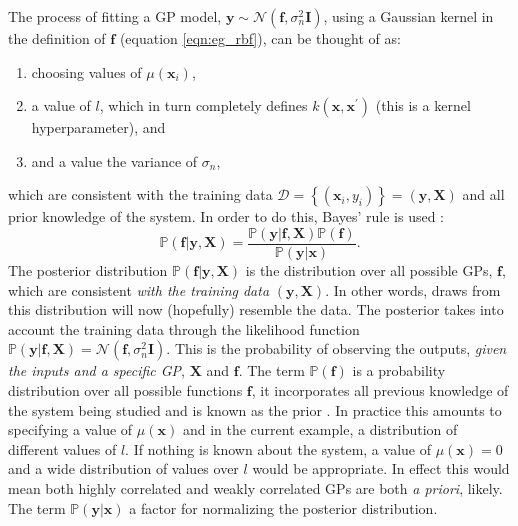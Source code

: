 The process of fitting a GP model, $\mathbf{y} \sim \mathcal{N}(\mathbf{f}, \sigma_{n}^{2}\mathbf{I})$, using a Gaussian kernel in the definition of $\mathbf{f}$ (equation \ref{eqn:eg_rbf}), can be thought of as: 
\begin{enumerate}
    \item choosing values of $\mu(\mathbf{x}_{i})$,
    \item a value of $l$, which in turn completely defines $k(\mathbf{x}, \mathbf{x}^{\prime})$ (this is a kernel hyperparameter), and
    \item and a value the variance of $\sigma_{n}$, 
\end{enumerate}  
which are consistent with the training data $\mathcal{D}=\left\{(\mathbf{x}_{i}, y_{i})\right\} = (\mathbf{y}, \mathbf{X})$ and all prior knowledge of the system. In order to do this,  Bayes' rule is used \cite{rasmussenGaussianProcessesMachine2006}:
\begin{equation}\label{eqn:ya_boy_bayes}
    \mathbb{P}(\mathbf{f}|\mathbf{y}, \mathbf{X})  = \frac{\mathbb{P}(\mathbf{y}|\mathbf{f}, \mathbf{X})\mathbb{P}(\mathbf{f})}{\mathbb{P}(\mathbf{y}|\mathbf{x})}. 
\end{equation}
The posterior distribution $\mathbb{P}(\mathbf{f}|\mathbf{y}, \mathbf{X})$ is the distribution over all possible GPs, $\mathbf{f}$, which are consistent \emph{with the training data} $(\mathbf{y}, \mathbf{X})$. In other words, draws from this distribution will now (hopefully) resemble the data. The posterior takes into account the training data  through the likelihood function $\mathbb{P}(\mathbf{y}|\mathbf{f}, \mathbf{X}) = \mathcal{N}(\mathbf{f}, \sigma_{n}^{2}\mathbf{I})$. This is the probability of observing the outputs, \emph{given the inputs and a specific GP}, $\mathbf{X}$ and $\mathbf{f}$.  The term $\mathbb{P}(\mathbf{f})$ is a probability distribution over all possible functions $\mathbf{f}$, it incorporates all previous knowledge of the system being studied and is known as the prior \cite{gelmanBayesianDataAnalysis2014}.  In practice this amounts to specifying a value of $\mu(\mathbf{x})$ and in the current example, a distribution of different values of $l$.  If nothing is known about the system, a value of $\mu(\mathbf{x})=0$ and a wide distribution of values over $l$ would be appropriate. In effect this would mean both highly correlated and weakly correlated GPs are both \emph{a priori}, likely\cite{gelmanBayesianDataAnalysis2014}.  The term $\mathbb{P}(\mathbf{y}|\mathbf{x})$  a factor for normalizing the posterior distribution. 

